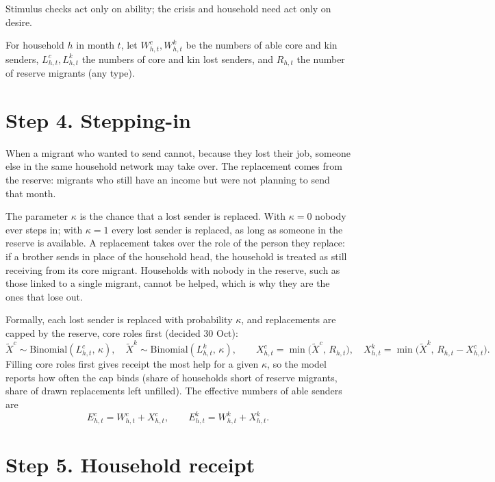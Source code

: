 \documentclass[11pt]{article}
\begin{document}
Stimulus checks act only on ability; the crisis and household need act only on desire.

For household $h$ in month $t$, let $W^c_{h,t}, W^k_{h,t}$ be the numbers of able core and kin senders, $L^c_{h,t}, L^k_{h,t}$ the numbers of core and kin lost senders, and $R_{h,t}$ the number of reserve migrants (any type).

\section*{Step 4. Stepping-in}

When a migrant who wanted to send cannot, because they lost their job, someone else in the same household network may take over. The replacement comes from the reserve: migrants who still have an income but were not planning to send that month.

The parameter $\kappa$ is the chance that a lost sender is replaced. With $\kappa = 0$ nobody ever steps in; with $\kappa = 1$ every lost sender is replaced, as long as someone in the reserve is available. A replacement takes over the role of the person they replace: if a brother sends in place of the household head, the household is treated as still receiving from its core migrant. Households with nobody in the reserve, such as those linked to a single migrant, cannot be helped, which is why they are the ones that lose out.

Formally, each lost sender is replaced with probability $\kappa$, and replacements are capped by the reserve, core roles first (decided 30 Oct):
\begin{equation}
\tilde X^c \sim \text{Binomial}(L^c_{h,t},\,\kappa), \quad \tilde X^k \sim \text{Binomial}(L^k_{h,t},\,\kappa), \qquad
X^c_{h,t} = \min\big(\tilde X^c,\, R_{h,t}\big), \quad X^k_{h,t} = \min\big(\tilde X^k,\, R_{h,t} - X^c_{h,t}\big).
\end{equation}
Filling core roles first gives receipt the most help for a given $\kappa$, so the model reports how often the cap binds (share of households short of reserve migrants, share of drawn replacements left unfilled). The effective numbers of able senders are
\begin{equation}
E^c_{h,t} = W^c_{h,t} + X^c_{h,t}, \qquad E^k_{h,t} = W^k_{h,t} + X^k_{h,t}.
\end{equation}

\section*{Step 5. Household receipt}
\end{document}
